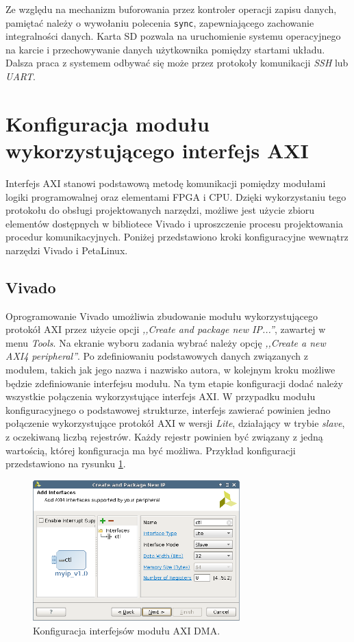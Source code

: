 Ze względu na mechanizm buforowania przez kontroler operacji zapisu danych, pamiętać należy o wywołaniu polecenia \texttt{sync}, zapewniającego zachowanie integralności danych.
Karta SD pozwala na uruchomienie systemu operacyjnego na karcie i przechowywanie danych użytkownika pomiędzy startami układu. 
Dalsza praca z systemem odbywać się może przez protokoły komunikacji \emph{SSH} lub \emph{UART}.

\section{Konfiguracja modułu wykorzystującego interfejs AXI}
\label{sec:vivado-axi-dma}

Interfejs AXI stanowi podstawową metodę komunikacji pomiędzy modułami logiki programowalnej oraz elementami FPGA i CPU. 
Dzięki wykorzystaniu tego protokołu do obsługi projektowanych narzędzi, możliwe jest użycie zbioru elementów dostępnych w bibliotece Vivado i uproszczenie procesu projektowania procedur komunikacyjnych. 
Poniżej przedstawiono kroki konfiguracyjne wewnątrz narzędzi Vivado i PetaLinux.

\subsection{Vivado}
Oprogramowanie Vivado umożliwia zbudowanie modułu wykorzystującego protokół AXI przez użycie opcji \emph{,,Create and package new IP...''}, zawartej w menu \emph{Tools}.
Na ekranie wyboru zadania wybrać należy opcję \emph{,,Create a new AXI4 peripheral''}.
Po zdefiniowaniu podstawowych danych związanych z modułem, takich jak jego nazwa i nazwisko autora, w kolejnym kroku możliwe będzie zdefiniowanie interfejsu modułu. 
Na tym etapie konfiguracji dodać należy wszystkie połączenia wykorzystujące interfejs AXI. 
W przypadku modułu konfiguracyjnego o podstawowej strukturze, interfejs zawierać powinien jedno połączenie wykorzystujące protokół AXI w wersji \emph{Lite}, działający w trybie \emph{slave}, z oczekiwaną liczbą rejestrów. 
Każdy rejestr powinien być związany z jedną wartością, której konfiguracja ma być możliwa. 
Przykład konfiguracji przedstawiono na rysunku \ref{fig:axi-dma-interfaces-conf}.


\begin{figure}[H]
	\centering
	\includegraphics[width=8cm]{img/vivado/axi-dma-interfaces-conf.png}
	\caption{Konfiguracja interfejsów modułu AXI DMA.}
	\label{fig:axi-dma-interfaces-conf}
\end{figure}

